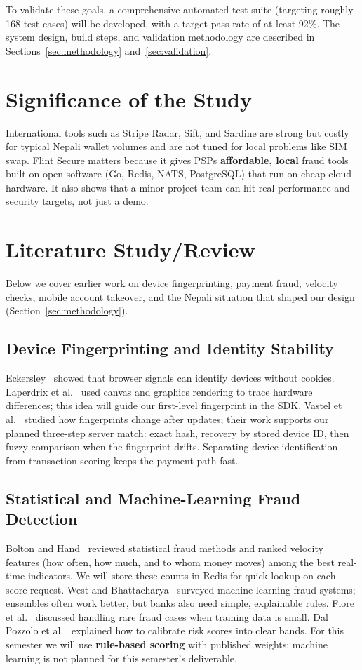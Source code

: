 To validate these goals, a comprehensive automated test suite (targeting roughly 168 test cases) will be developed, with a target pass rate of at least 92\%. The system design, build steps, and validation methodology are described in Sections~\ref{sec:methodology} and~\ref{sec:validation}.

\section{Significance of the Study}

International tools such as Stripe Radar, Sift, and Sardine are strong but costly for typical
Nepali wallet volumes and are not tuned for local problems like SIM swap. Flint Secure matters
because it gives PSPs \textbf{affordable, local} fraud tools built on open software (Go, Redis,
NATS, PostgreSQL) that run on cheap cloud hardware. It also shows that a minor-project team can
hit real performance and security targets, not just a demo.

\section{Literature Study/Review}
\label{sec:literature}

Below we cover earlier work on device fingerprinting, payment fraud, velocity checks,
mobile account takeover, and the Nepali situation that shaped our design
(Section~\ref{sec:methodology}).

\subsection{Device Fingerprinting and Identity Stability}
Eckersley~\cite{eckersley2010} showed that browser signals can identify devices without
cookies. Laperdrix et al.~\cite{laperdrix2016} used canvas and graphics rendering to trace
hardware differences; this idea will guide our first-level fingerprint in the SDK.
Vastel et al.~\cite{vastel2018} studied how fingerprints change after updates; their work
supports our planned three-step server match: exact hash, recovery by stored device ID, then
fuzzy comparison when the fingerprint drifts. Separating device identification from transaction
scoring keeps the payment path fast.

\subsection{Statistical and Machine-Learning Fraud Detection}
Bolton and Hand~\cite{bolton2002} reviewed statistical fraud methods and ranked velocity
features (how often, how much, and to whom money moves) among the best real-time indicators.
We will store these counts in Redis for quick lookup on each score request. West and
Bhattacharya~\cite{west2016} surveyed machine-learning fraud systems; ensembles often work
better, but banks also need simple, explainable rules. Fiore et al.~\cite{fiore2019} discussed
handling rare fraud cases when training data is small. Dal Pozzolo et al.~\cite{dalpozzolo2015}
explained how to calibrate risk scores into clear bands. For this semester we will use
\textbf{rule-based scoring} with published weights; machine learning is not planned for
this semester's deliverable.


